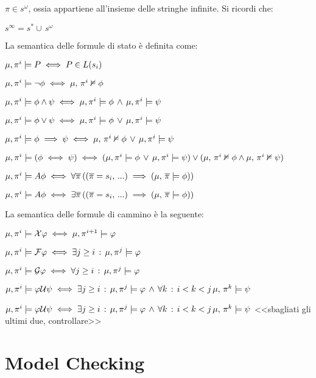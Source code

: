$\pi\in s^{\omega}$, ossia appartiene all'insieme delle stringhe
infinite. Si ricordi che:

$s^{\infty}=s^{*}\cup\, s^{\omega}$

La semantica delle formule di stato è definita come:

$\mu,\pi^{i}\models P\iff P\in L(s_{i})$

$\mu,\pi^{i}\models\neg\phi\iff\mu,\,\pi^{i}\nvDash\phi$

$\mu,\pi^{i}\models\phi\wedge\psi\iff\mu,\pi^{i}\models\phi\,\wedge\,\mu,\pi^{i}\models\psi$

$\mu,\pi^{i}\models\phi\vee\psi\iff\mu,\pi^{i}\models\phi\,\vee\,\mu,\pi^{i}\models\psi$

$\mu,\pi^{i}\models\phi\implies\psi\iff\mu,\,\pi^{i}\nvDash\phi\,\vee\,\mu,\pi^{i}\models\psi$

$\mu,\pi^{i}\models(\phi\iff\psi)\iff(\mu,\pi^{i}\models\phi\,\vee\,\mu,\pi^{i}\models\psi)\vee(\mu,\,\pi^{i}\nvDash\phi\wedge\mu,\,\pi^{i}\nvDash\psi)$

$\mu,\pi^{i}\models A\phi\iff\forall\overline{\pi}\,((\overline{\pi}=s_{i},\,...)\implies(\mu,\,\overline{\pi}\models\phi))$

$\mu,\pi^{i}\models A\phi\iff\exists\overline{\pi}\,((\overline{\pi}=s_{i},\,...)\implies(\mu,\,\overline{\pi}\models\phi))$

La semantica delle formule di cammino è la seguente:

$\mu,\pi^{i}\models\mathcal{X}\varphi\iff\mu,\pi^{i+1}\models\varphi$

$\mu,\pi^{i}\models\mathcal{F}\varphi\iff\exists j\geq i\,:\,\mu,\pi^{j}\models\varphi$

$\mu,\pi^{i}\models\mathcal{G}\varphi\iff\forall j\geq i\,:\,\mu,\pi^{j}\models\varphi$

$\mu,\pi^{i}\models\varphi\mathcal{U}\psi\iff\exists j\geq i\,:\,\mu,\pi^{j}\models\varphi\,\wedge\,\forall k\,:\, i<k<j\,\mu,\,\pi^{k}\models\psi$

$\mu,\pi^{i}\models\varphi\mathcal{U}\psi\iff\exists j\geq i\,:\,\mu,\pi^{j}\models\varphi\,\wedge\,\forall k\,:\, i<k<j\,\mu,\,\pi^{k}\models\psi$
<\textcompwordmark{}<sbagliati gli ultimi due, controllare>\textcompwordmark{}>


\section{Model Checking}


